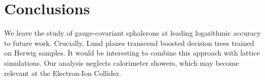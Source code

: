 \section{Conclusions}\label{sec:conclusions}

We leave the study of gauge-covariant sphalerons at leading logarithmic
accuracy to future work. Crucially, Lund planes transcend boosted
decision trees trained on Herwig samples. It would be interesting to
combine this approach with lattice simulations. Our analysis neglects
calorimeter showers, which may become relevant at the Electron-Ion
Collider.

